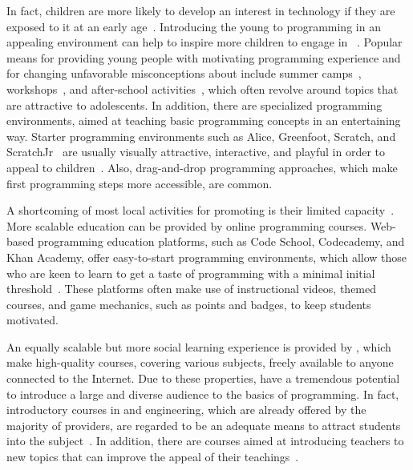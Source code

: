 In fact, children are more likely to develop an interest in technology if they are exposed to it at an early age~\cite{lau2009learning}. Introducing the young to programming in an appealing environment can help to inspire more children to engage in \cs~\cite{liyanagunawardena2014teaching}. Popular means for providing young people with motivating programming experience and for changing unfavorable misconceptions about \cs include summer camps~\cite{alhumoud2014using}, workshops~\cite{lau2009learning}, and after-school activities~\cite{maloney2008programming}, which often revolve around topics that are attractive to adolescents. In addition, there are specialized programming environments, aimed at teaching basic programming concepts in an entertaining way. Starter programming environments such as Alice, Greenfoot, Scratch, and ScratchJr~\cite{fincher2010comparing} are usually visually attractive, interactive, and playful in order to appeal to children~\cite{giordano2014use}. Also, drag-and-drop programming approaches, which make first programming steps more accessible, are common.

A shortcoming of most local activities for promoting \cs is their limited capacity~\cite{loewis2014scaling}. More scalable \cs education can be provided by online programming courses. Web-based programming education platforms, such as Code School, Codecademy, and Khan Academy, offer easy-to-start programming environments, which allow those who are keen to learn to get a taste of programming with a minimal initial threshold~\cite{vihavainen2012multi}. These platforms often make use of instructional videos, themed courses, and game mechanics, such as points and badges, to keep students motivated.

An equally scalable but more social learning experience is provided by \moocs, which make high-quality courses, covering various subjects, freely available to anyone connected to the Internet. Due to these properties, \moocs have a tremendous potential to introduce a large and diverse audience to the basics of programming. In fact, introductory courses in \cs and engineering, which are already offered by the majority of \mooc providers, are regarded to be an adequate means to attract students into the subject~\cite{vihavainen2012multi}. In addition, there are courses aimed at introducing teachers to new topics that can improve the appeal of their teachings~\cite{kay2014challenges}.

